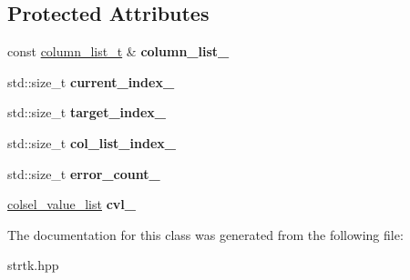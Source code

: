 \subsection*{Protected Attributes}
\begin{DoxyCompactItemize}
\item 
\hypertarget{classstrtk_1_1details_1_1column__selector__base_aed847ac1683ee07df619c61b3034b3ae}{const \hyperlink{structstrtk_1_1details_1_1column__list__impl}{column\-\_\-list\-\_\-t} \& {\bfseries column\-\_\-list\-\_\-}}\label{classstrtk_1_1details_1_1column__selector__base_aed847ac1683ee07df619c61b3034b3ae}

\item 
\hypertarget{classstrtk_1_1details_1_1column__selector__base_a54806fb16de171be4fa0d59fadb8876e}{std\-::size\-\_\-t {\bfseries current\-\_\-index\-\_\-}}\label{classstrtk_1_1details_1_1column__selector__base_a54806fb16de171be4fa0d59fadb8876e}

\item 
\hypertarget{classstrtk_1_1details_1_1column__selector__base_a02bd38d732e5f2af11a7bb2d34566b65}{std\-::size\-\_\-t {\bfseries target\-\_\-index\-\_\-}}\label{classstrtk_1_1details_1_1column__selector__base_a02bd38d732e5f2af11a7bb2d34566b65}

\item 
\hypertarget{classstrtk_1_1details_1_1column__selector__base_a739474cd874976cfcaa490a80096ad0a}{std\-::size\-\_\-t {\bfseries col\-\_\-list\-\_\-index\-\_\-}}\label{classstrtk_1_1details_1_1column__selector__base_a739474cd874976cfcaa490a80096ad0a}

\item 
\hypertarget{classstrtk_1_1details_1_1column__selector__base_a790676f26f4409a4b4e00d530bc3b9f2}{std\-::size\-\_\-t {\bfseries error\-\_\-count\-\_\-}}\label{classstrtk_1_1details_1_1column__selector__base_a790676f26f4409a4b4e00d530bc3b9f2}

\item 
\hypertarget{classstrtk_1_1details_1_1column__selector__base_a16a9b0b39f14296d49c4115d4cb10801}{\hyperlink{classstrtk_1_1details_1_1column__selector__base_1_1colsel__value__list}{colsel\-\_\-value\-\_\-list} {\bfseries cvl\-\_\-}}\label{classstrtk_1_1details_1_1column__selector__base_a16a9b0b39f14296d49c4115d4cb10801}

\end{DoxyCompactItemize}


The documentation for this class was generated from the following file\-:\begin{DoxyCompactItemize}
\item 
strtk.\-hpp\end{DoxyCompactItemize}
